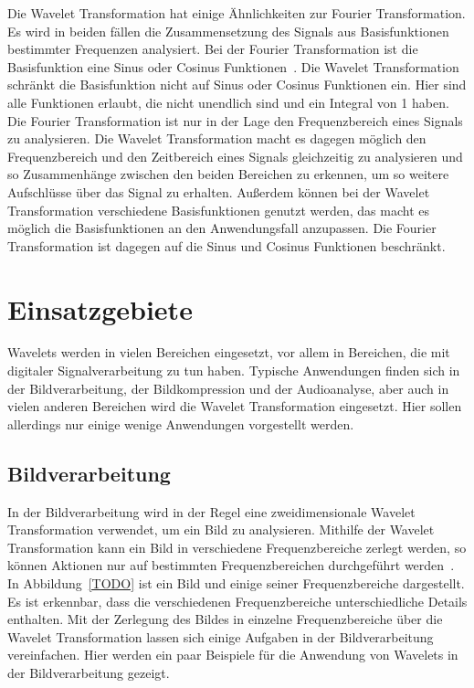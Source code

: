 \documentclass[12pt, a4paper, ngerman]{article}
\begin{document}
Die Wavelet Transformation hat einige Ähnlichkeiten zur Fourier Transformation.
Es wird in beiden fällen die Zusammensetzung des Signals aus Basisfunktionen bestimmter Frequenzen analysiert.
Bei der Fourier Transformation ist die Basisfunktion eine Sinus oder Cosinus Funktionen~\cite[S.5]{wavelets_intro}.
Die Wavelet Transformation schränkt die Basisfunktion nicht auf Sinus oder Cosinus Funktionen ein.
Hier sind alle Funktionen erlaubt, die nicht unendlich sind und ein Integral von 1 haben.
Die Fourier Transformation ist nur in der Lage den Frequenzbereich eines Signals zu analysieren.
Die Wavelet Transformation macht es dagegen möglich den Frequenzbereich und den Zeitbereich eines Signals
gleichzeitig zu analysieren und so Zusammenhänge zwischen den beiden Bereichen zu erkennen,
um so weitere Aufschlüsse über das Signal zu erhalten.
Außerdem können bei der Wavelet Transformation verschiedene Basisfunktionen genutzt werden,
das macht es möglich die Basisfunktionen an den Anwendungsfall anzupassen.
Die Fourier Transformation ist dagegen auf die Sinus und Cosinus Funktionen beschränkt.

\section{Einsatzgebiete}

Wavelets werden in vielen Bereichen eingesetzt,
vor allem in Bereichen, die mit digitaler Signalverarbeitung zu tun haben.
Typische Anwendungen finden sich in der Bildverarbeitung, der Bildkompression und der Audioanalyse,
aber auch in vielen anderen Bereichen wird die Wavelet Transformation eingesetzt.
Hier sollen allerdings nur einige wenige Anwendungen vorgestellt werden.

\subsection{Bildverarbeitung}


In der Bildverarbeitung wird in der Regel eine zweidimensionale Wavelet Transformation verwendet,
um ein Bild zu analysieren.
Mithilfe der Wavelet Transformation kann ein Bild in verschiedene Frequenzbereiche zerlegt werden,
so können Aktionen nur auf bestimmten Frequenzbereichen durchgeführt werden~\cite[S.38]{dt_manual}.
In Abbildung~\ref{TODO} ist ein Bild und einige seiner Frequenzbereiche dargestellt.
Es ist erkennbar, dass die verschiedenen Frequenzbereiche unterschiedliche Details enthalten.
Mit der Zerlegung des Bildes in einzelne Frequenzbereiche über die Wavelet Transformation
lassen sich einige Aufgaben in der Bildverarbeitung vereinfachen.
Hier werden ein paar Beispiele für die Anwendung von Wavelets in der Bildverarbeitung gezeigt.
\end{document}
